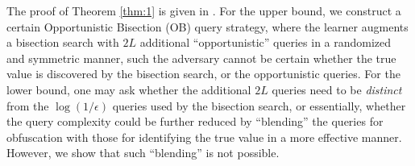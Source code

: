 \documentclass[final,12pt]{colt2018}
\begin{document}
{The proof of Theorem \ref{thm:1} is given in \cite{tsitsiklis2018private}. For the upper bound, we construct a certain Opportunistic Bisection (OB) query strategy, where the learner augments a bisection search with $2L$ additional ``opportunistic'' queries in a randomized and symmetric manner, such the adversary cannot be certain whether the true value is discovered by the bisection search, or the opportunistic queries. For the lower bound, one may ask whether the additional $2L$ queries need to be \emph{distinct} from the $\log(1/\epsilon)$ queries used by the bisection search, {or essentially, whether} the query complexity could be further reduced by ``blending'' the queries for obfuscation with those for identifying the true value in a more effective manner. However, we show that  such ``blending'' is not possible. }





\end{document}
